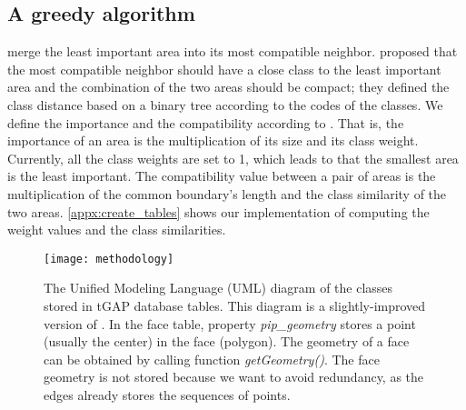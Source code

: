 \documentclass[twocolumn]{svjour3}          %
\begin{document}
\subsection{A greedy algorithm}
\label{sec:greedy_algo}

merge the least important area into its most compatible neighbor.
\citet{Peng2020AreaAgg} proposed that 
the most compatible neighbor should have a close class
to the least important area
and the combination of the two areas should be compact;
they defined the class distance based on a binary tree
according to the codes of the classes.
We define the importance and the compatibility according to
\citet{vanPutten1998NewGAP}.
That is, the importance of an area is the multiplication 
of its size and its class weight.
Currently, all the class weights are set to 1,
which leads to that the smallest area is the least important.
The compatibility value between a pair of areas is 
the multiplication of the common boundary's length and 
the class similarity of the two areas.
\appx\ref{appx:create_tables} shows our implementation of
computing the weight values and the class similarities.



\begin{figure*}[tb]
\centering
\texttt{[image: methodology]}
\caption{The Unified Modeling Language (UML) diagram of the classes 
stored in tGAP database tables.
This diagram is a slightly-improved version of 
\citet[]{Meijers2011Thesis}.
In the face table, property \emph{pip\_geometry} 
stores a point (usually the center) in the face (polygon).
The geometry of a face can be obtained 
by calling function \emph{getGeometry()}.
The face geometry is not stored 
because we want to avoid redundancy,
as the edges already stores the sequences of points.
}
\label{fig:uml_tgap}
\end{figure*}
\end{document}
